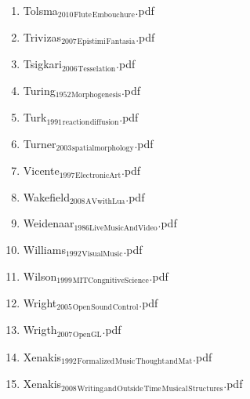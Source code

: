 \documentclass[11pt]{article}
\begin{document}
\begin{enumerate}
\begin{enumerate}
\begin{enumerate}
\begin{enumerate}
\begin{enumerate}
\item Tolsma$_{\text{2010}}$$_{\text{Flute}}$$_{\text{Embouchure}}$.pdf
\label{sec-1-1-1-1-7-1-1-116}

\item Trivizas$_{\text{2007}}$$_{\text{Epistimi}}$$_{\text{Fantasia}}$.pdf
\label{sec-1-1-1-1-7-1-1-117}

\item Tsigkari$_{\text{2006}}$$_{\text{Tesselation}}$.pdf
\label{sec-1-1-1-1-7-1-1-118}

\item Turing$_{\text{1952}}$$_{\text{Morphogenesis}}$.pdf
\label{sec-1-1-1-1-7-1-1-119}

\item Turk$_{\text{1991}}$$_{\text{reaction}}$$_{\text{diffusion}}$.pdf
\label{sec-1-1-1-1-7-1-1-120}

\item Turner$_{\text{2003}}$$_{\text{spatialmorphology}}$.pdf
\label{sec-1-1-1-1-7-1-1-121}

\item Vicente$_{\text{1997}}$$_{\text{ElectronicArt}}$.pdf
\label{sec-1-1-1-1-7-1-1-122}

\item Wakefield$_{\text{2008}}$$_{\text{AVwithLua}}$.pdf
\label{sec-1-1-1-1-7-1-1-123}

\item Weidenaar$_{\text{1986LiveMusicAndVideo}}$.pdf
\label{sec-1-1-1-1-7-1-1-124}

\item Williams$_{\text{1992}}$$_{\text{VisualMusic}}$.pdf
\label{sec-1-1-1-1-7-1-1-125}

\item Wilson$_{\text{1999}}$$_{\text{MITCongnitiveScience}}$.pdf
\label{sec-1-1-1-1-7-1-1-126}

\item Wright$_{\text{2005}}$$_{\text{Open}}$$_{\text{Sound}}$$_{\text{Control}}$.pdf
\label{sec-1-1-1-1-7-1-1-127}

\item Wrigth$_{\text{2007}}$$_{\text{OpenGL}}$.pdf
\label{sec-1-1-1-1-7-1-1-128}

\item Xenakis$_{\text{1992}}$$_{\text{Formalized}}$$_{\text{Music}}$$_{\text{Thought}}$$_{\text{and}}$$_{\text{Mat}}$.pdf
\label{sec-1-1-1-1-7-1-1-129}

\item Xenakis$_{\text{2008}}$$_{\text{Writing}}$$_{\text{and}}$$_{\text{Outside}}$$_{\text{Time}}$$_{\text{Musical}}$$_{\text{Structures}}$.pdf
\label{sec-1-1-1-1-7-1-1-130}


\end{enumerate}
\end{enumerate}
\end{enumerate}
\end{enumerate}
\end{enumerate}
\end{document}
